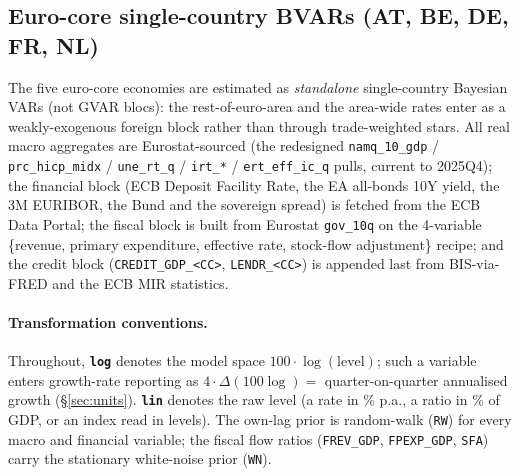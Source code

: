 \subsection{Euro-core single-country BVARs (AT, BE, DE, FR, NL)}
\label{sec:data:eurocore}

The five euro-core economies are estimated as \emph{standalone} single-country
Bayesian VARs (not GVAR blocs): the rest-of-euro-area and the area-wide rates
enter as a weakly-exogenous foreign block rather than through trade-weighted
stars. All real macro aggregates are Eurostat-sourced (the redesigned
\texttt{namq\_10\_gdp} / \texttt{prc\_hicp\_midx} / \texttt{une\_rt\_q} /
\texttt{irt\_*} / \texttt{ert\_eff\_ic\_q} pulls, current to 2025Q4); the
financial block (ECB Deposit Facility Rate, the EA all-bonds 10Y yield, the
3M EURIBOR, the Bund and the sovereign spread) is fetched from the ECB Data
Portal; the fiscal block is built from Eurostat \texttt{gov\_10q} on the
4-variable \{revenue, primary expenditure, effective rate, stock-flow
adjustment\} recipe; and the credit block (\texttt{CREDIT\_GDP\_<CC>},
\texttt{LENDR\_<CC>}) is appended last from BIS-via-FRED and the ECB MIR
statistics.

\paragraph{Transformation conventions.}
Throughout, \textbf{\texttt{log}} denotes the model space $100\cdot\log(\text{level})$;
such a variable enters growth-rate reporting as $4\cdot\Delta(100\log)=$
quarter-on-quarter annualised growth (\S\ref{sec:units}). \textbf{\texttt{lin}}
denotes the raw level (a rate in \% p.a., a ratio in \% of GDP, or an index
read in levels). The own-lag prior is random-walk (\texttt{RW}) for every
macro and financial variable; the fiscal flow ratios
(\texttt{FREV\_GDP}, \texttt{FPEXP\_GDP}, \texttt{SFA}) carry the stationary
white-noise prior (\texttt{WN}).

